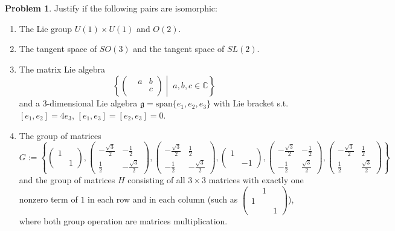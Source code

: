 \documentclass{article}
\theoremstyle{definition}
\newtheorem{problem}{Problem}
\theoremstyle{plain}
\begin{document}
\begin{problem}
Justify if the following pairs are isomorphic:
\begin{enumerate}
\item The Lie group $U(1)\times U(1)$ and $O(2)$.
\item The tangent space of $SO(3)$ and the tangent space of $SL(2)$.
\item The matrix Lie algebra
\begin{displaymath}
\left\{\begin{pmatrix}&a&b\\ &&c\\&&\end{pmatrix}\middle|\;a,b,c\in\mathbb{C}\right\}
\end{displaymath}
and a 3-dimensional Lie algebra $\mathfrak{g}=\mathrm{span}\{e_1,e_2,e_3\}$ with Lie bracket s.t. $[e_1,e_2]=4e_3$, $[e_1,e_3]=[e_2,e_3]=0$.
\item The group of matrices
\begin{displaymath}
G:=\left\{\begin{pmatrix}1&\\ &1\end{pmatrix},\begin{pmatrix}-\frac{\sqrt{3}}{2}&-\frac{1}{2}\\ \frac{1}{2}&-\frac{\sqrt{3}}{2}\end{pmatrix},\begin{pmatrix}-\frac{\sqrt{3}}{2}&\frac{1}{2}\\ -\frac{1}{2}&-\frac{\sqrt{3}}{2}\end{pmatrix},\begin{pmatrix}1&\\ &-1\end{pmatrix},\begin{pmatrix}-\frac{\sqrt{3}}{2}&-\frac{1}{2}\\ -\frac{1}{2}&\frac{\sqrt{3}}{2}\end{pmatrix},\begin{pmatrix}-\frac{\sqrt{3}}{2}&\frac{1}{2}\\ \frac{1}{2}&\frac{\sqrt{3}}{2}\end{pmatrix}\right\}
\end{displaymath}
and the group of matrices $H$ consisting of all $3\times3$ matrices with exactly one nonzero term of $1$ in each row and in each column (such as $\begin{pmatrix}&1&\\ 1&&\\&&1\end{pmatrix}$), where both group operation are matrices multiplication.
\end{enumerate}
\end{problem}
\end{document}
